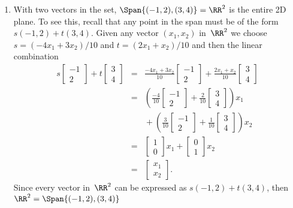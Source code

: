 \begin{example}
\begin{enumerate}
\item With two vectors in the set, \(\Span\{(-1,2),(3,4)\}=\RR^2\) is the entire 2D plane.
To see this, recall that any point in the span must be of the form \(s(-1,2)+t(3,4)\).
Given any vector \((x_1,x_2)\) in~\(\RR^2\) we choose \(s=(-4x_1+3x_2)/10\) and \(t=(2x_1+x_2)/10\) and then the linear combination
\begin{eqnarray*}
s\begin{bmatrix} -1\\2 \end{bmatrix}+t\begin{bmatrix} 3\\4 \end{bmatrix}
&=&\frac{-4x_1+3x_2}{10}\begin{bmatrix} -1\\2 \end{bmatrix}+\frac{2x_1+x_2}{10}\begin{bmatrix} 3\\4 \end{bmatrix}
\\&=&\left(\frac{-4}{10}\begin{bmatrix} -1\\2 \end{bmatrix}+\frac{2}{10}\begin{bmatrix} 3\\4 \end{bmatrix}\right)x_1
\\&&{}
+\left(\frac{3}{10}\begin{bmatrix} -1\\2 \end{bmatrix}+\frac{1}{10}\begin{bmatrix} 3\\4 \end{bmatrix}\right)x_2
\\&=&\begin{bmatrix} 1\\0 \end{bmatrix}x_1
+\begin{bmatrix} 0\\1 \end{bmatrix}x_2
\\&=&\begin{bmatrix} x_1\\x_2 \end{bmatrix}.
\end{eqnarray*}
Since every vector in~\(\RR^2\) can be expressed as \(s(-1,2)+t(3,4)\), then \(\RR^2=\Span\{(-1,2),(3,4)\}\)


\end{enumerate}
\end{example}
